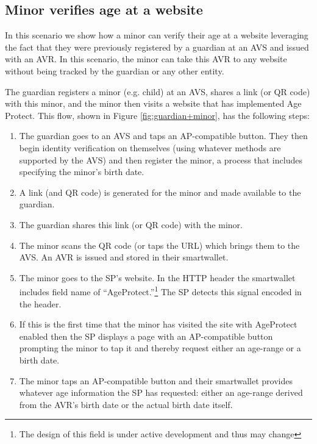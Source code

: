 \documentclass[11pt, oneside]{article}   	%
\begin{document}
\subsection{Minor verifies age at a website}

In this scenario we show how a minor can verify their age at a website leveraging the fact that they were previously registered by a guardian at an AVS and issued with an AVR. In this scenario, the minor can take this AVR to any website without being tracked by the guardian or any other entity. 

The guardian registers a minor (e.g. child) at an AVS, shares a link (or QR code) with this minor, and the minor then visits a website that has implemented Age Protect. This flow, shown in Figure \ref{fig:guardian+minor}, has the following steps:
\begin{enumerate}
	\item The guardian goes to an AVS and taps an AP-compatible button. They then begin identity verification on themselves (using whatever methods are supported by the AVS) and then register the minor, a process that includes specifying the minor's birth date.
	\item A link (and QR code) is generated for the minor and made available to the guardian.
	\item The guardian shares this link (or QR code) with the minor.
	\item The minor scans the QR code (or taps the URL) which brings them to the AVS. An AVR is issued and stored in their smartwallet.
	\item The minor goes to the SP's website. In the HTTP header the smartwallet includes field name of ``AgeProtect.''\footnote{The design of this field is under active development and thus may change} The SP detects this signal encoded in the header.
	\item If this is the first time that the minor has visited the site with AgeProtect enabled then the SP displays a page with an AP-compatible button prompting the minor to tap it and thereby request either an age-range or a birth date.
	\item The minor taps an AP-compatible button and their smartwallet provides whatever age information the SP has requested: either an age-range derived from the AVR's birth date or the actual birth date itself.
\end{enumerate}
\end{document}
